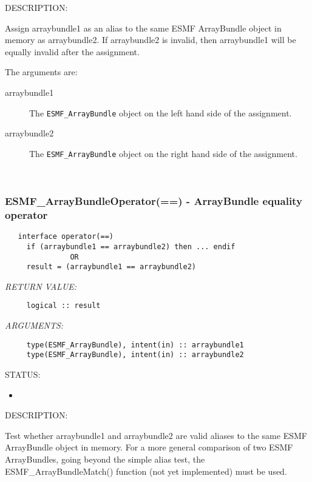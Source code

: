 {\sf DESCRIPTION:\\ }


     Assign arraybundle1 as an alias to the same ESMF ArrayBundle object in memory
     as arraybundle2. If arraybundle2 is invalid, then arraybundle1 will be equally invalid after
     the assignment.
  
     The arguments are:
     \begin{description}
     \item[arraybundle1]
       The {\tt ESMF\_ArrayBundle} object on the left hand side of the assignment.
     \item[arraybundle2]
       The {\tt ESMF\_ArrayBundle} object on the right hand side of the assignment.
     \end{description}
   
 
\mbox{}\hrulefill\ 
 
\subsubsection [ESMF\_ArrayBundleOperator(==)] {ESMF\_ArrayBundleOperator(==) - ArrayBundle equality operator}


  
\begin{verbatim}   interface operator(==)
     if (arraybundle1 == arraybundle2) then ... endif
               OR
     result = (arraybundle1 == arraybundle2)\end{verbatim}{\em RETURN VALUE:}
\begin{verbatim}     logical :: result\end{verbatim}{\em ARGUMENTS:}
\begin{verbatim}     type(ESMF_ArrayBundle), intent(in) :: arraybundle1
     type(ESMF_ArrayBundle), intent(in) :: arraybundle2\end{verbatim}
{\sf STATUS:}
   \begin{itemize}
   \item{}
   \end{itemize}
  
{\sf DESCRIPTION:\\ }


     \begin{sloppypar}
     Test whether arraybundle1 and arraybundle2 are valid aliases to the same ESMF
     ArrayBundle object in memory. For a more general comparison of two ESMF ArrayBundles,
     going beyond the simple alias test, the ESMF\_ArrayBundleMatch() function (not yet
     implemented) must be used.
     \end{sloppypar}
  
